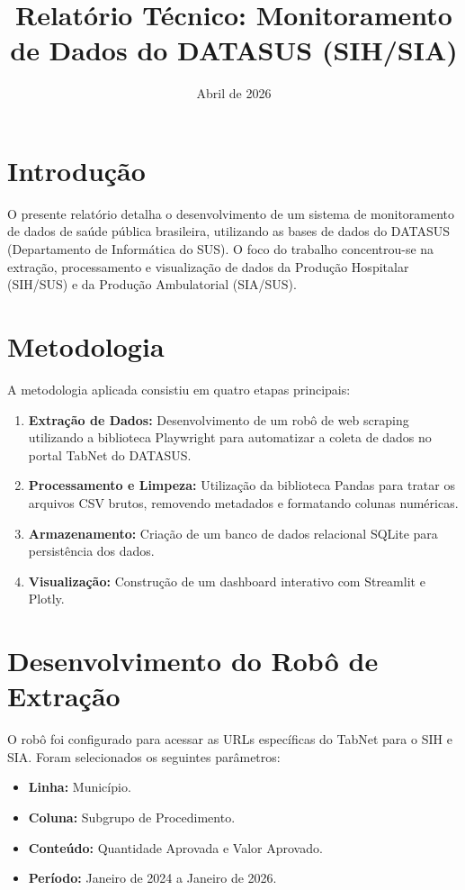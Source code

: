 \documentclass[12pt,a4paper]{article}
\title{Relatório Técnico: Monitoramento de Dados do DATASUS (SIH/SIA)}
\date{Abril de 2026}
\begin{document}
\maketitle

\newpage
\tableofcontents
\newpage

\section{Introdução}
O presente relatório detalha o desenvolvimento de um sistema de monitoramento de dados de saúde pública brasileira, utilizando as bases de dados do DATASUS (Departamento de Informática do SUS). O foco do trabalho concentrou-se na extração, processamento e visualização de dados da Produção Hospitalar (SIH/SUS) e da Produção Ambulatorial (SIA/SUS).

\section{Metodologia}
A metodologia aplicada consistiu em quatro etapas principais:
\begin{enumerate}
    \item \textbf{Extração de Dados:} Desenvolvimento de um robô de web scraping utilizando a biblioteca Playwright para automatizar a coleta de dados no portal TabNet do DATASUS.
    \item \textbf{Processamento e Limpeza:} Utilização da biblioteca Pandas para tratar os arquivos CSV brutos, removendo metadados e formatando colunas numéricas.
    \item \textbf{Armazenamento:} Criação de um banco de dados relacional SQLite para persistência dos dados.
    \item \textbf{Visualização:} Construção de um dashboard interativo com Streamlit e Plotly.
\end{enumerate}

\section{Desenvolvimento do Robô de Extração}
O robô foi configurado para acessar as URLs específicas do TabNet para o SIH e SIA. Foram selecionados os seguintes parâmetros:
\begin{itemize}
    \item \textbf{Linha:} Município.
    \item \textbf{Coluna:} Subgrupo de Procedimento.
    \item \textbf{Conteúdo:} Quantidade Aprovada e Valor Aprovado.
    \item \textbf{Período:} Janeiro de 2024 a Janeiro de 2026.
\end{itemize}
\end{document}
